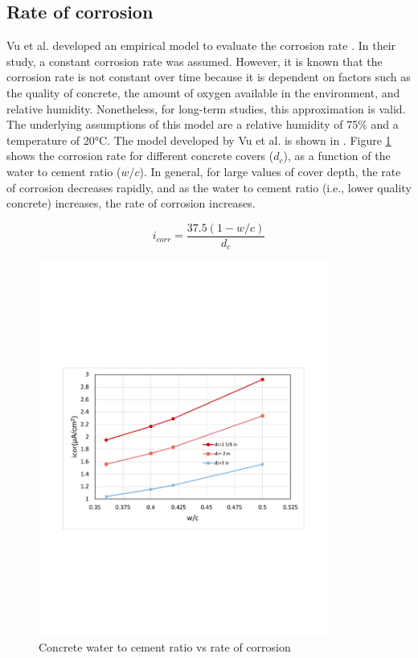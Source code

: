 \subsection{Rate of corrosion}

Vu et al. developed an empirical model to evaluate the corrosion rate \cite{Vu2000}\cite{Stewart1998}. In their study, a constant corrosion rate was assumed. However, it is known that the corrosion rate is not constant over time because it is dependent on factors such as the quality of concrete, the amount of oxygen available in the environment, and relative humidity. Nonetheless, for long-term studies, this approximation is valid. The underlying assumptions of this model are a relative humidity of 75\% and a temperature of 20°C. The model developed by Vu et al. is shown in . Figure \ref{fig:hist1} shows the corrosion rate for different concrete covers ($d_c$), as a function of the water to cement ratio ($w/c$). In general, for large values of cover depth, the rate of corrosion decreases rapidly, and as the water to cement ratio (i.e., lower quality concrete) increases, the rate of corrosion increases.

\begin{equation}
  i_{corr}=\frac{37.5(1-w/c)}{d_c}
  \label{eq.CorrosionRate}
\end{equation} 

\begin{figure}[htbp]
\centering
\includegraphics[width=0.85\textwidth]{Chapter-2/figs/wc_icor}
\caption{Concrete water to cement ratio vs rate of corrosion}
\label{fig:hist1}
\end{figure}

